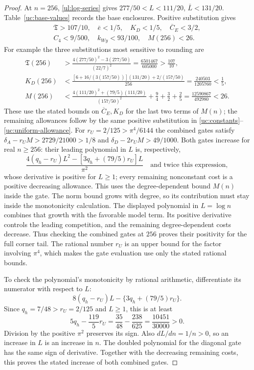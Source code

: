 \begin{proof}
At $n=256$, \eqref{ul:log-series} gives $277/50<L<111/20$,
$\bar{L}<131/20$. Table~\ref{uc:base-values} records the base enclosures.
Positive substitution gives
\begin{gather*}
 \mathfrak{T}>107/10,\quad\bar e<1/5,\quad K_D<1/5,\quad
 \overline C_E<3/2,\\ C_4<9/500,\quad
 k_{Wy}<93/100,\quad M(256)<26.
\end{gather*}
For example the three substitutions most sensitive to rounding are
\[
 \begin{aligned}
 \mathfrak T(256)&>
 \frac{4(277/50)^2-3(277/50)}{(22/7)^2}
 =\frac{6501467}{605000}>\frac{107}{10},\\
 K_D(256)&<\frac{[6+16/(3(157/50))](131/20)+2/(157/50)}{256}
 =\frac{240503}{1205760}<\frac15,\\
 M(256)&<\frac{4(111/20)^2+(79/5)(111/20)}{(157/50)^2}
              +\frac94+\frac32+\frac25
 =\frac{12590867}{492980}<26.
 \end{aligned}
\]
These use the stated bounds on $\overline C_E,K_D$ for the last two
terms of $M(n)$; the remaining allowances follow by the same positive
substitution in \eqref{uc:constants}--\eqref{uc:uniform-allowance}.
For $r_U=2/125>\pi^4/6144$ the combined gates satisfy
$\delta_A-r_UM>2729/21000>1/8$ and
$\delta_D-2r_UM>49/1000$.
Both gates increase for real $n\geq256$: their leading polynomial
in $L$ is, respectively,
\[
 \frac{4(q_h-r_U)L^2-[3q_h+(79/5)r_U]L}{\pi^2}
 \quad\text{and twice this expression},
\]
whose derivative is positive for $L\geq1$; every remaining
nonconstant cost is a positive decreasing allowance.  This uses the
degree-dependent bound $M(n)$ inside the gate.
The norm bound grows with degree, so its contribution must stay
inside the monotonicity calculation.  The displayed polynomial in
$L=\log n$ combines that growth with the favorable model term.
Its positive derivative controls the leading competition, and the
remaining degree-dependent costs decrease.  Thus checking the
combined gates at $256$ proves their positivity for the full
corner tail.  The rational number $r_U$ is an upper bound for the
factor involving $\pi^4$, which makes the gate evaluation use
only the stated rational bounds.

To check the polynomial's monotonicity by rational arithmetic, differentiate its numerator with respect to $L$:
\[
 8(q_h-r_U)L-\{3q_h+(79/5)r_U\}.
\]
Since $q_h=7/48>r_U=2/125$ and $L\geq1$, this is at least
\[
 5q_h-\frac{119}{5}r_U
   =\frac{35}{48}-\frac{238}{625}
   =\frac{10451}{30000}>0.
\]
Division by the positive $\pi^2$ preserves its sign.  Also
$dL/dn=1/n>0$, so an increase in $L$ is an increase in $n$.
The doubled polynomial for the diagonal gate has the same sign
of derivative.  Together with the decreasing remaining costs,
this proves the stated increase of both combined gates.


\end{proof}

